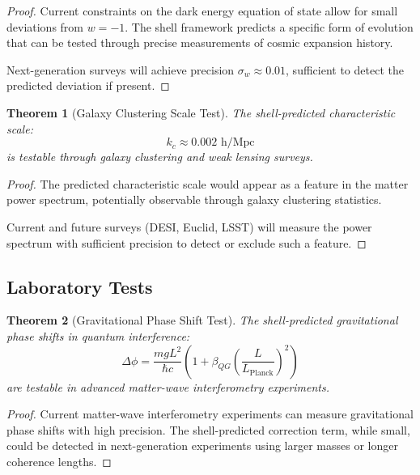 \documentclass[12pt,a4paper]{article}
\newtheorem{theorem}{Theorem}[section]
\begin{document}
\begin{proof}
Current constraints on the dark energy equation of state allow for small deviations from $w = -1$. The shell framework predicts a specific form of evolution that can be tested through precise measurements of cosmic expansion history.

Next-generation surveys will achieve precision $\sigma_w \approx 0.01$, sufficient to detect the predicted deviation if present.
\end{proof}

\begin{theorem}[Galaxy Clustering Scale Test]
\label{thm:galaxy-clustering}
The shell-predicted characteristic scale:
\begin{equation}
k_c \approx 0.002 \text{ h/Mpc}
\end{equation}
is testable through galaxy clustering and weak lensing surveys.
\end{theorem}

\begin{proof}
The predicted characteristic scale would appear as a feature in the matter power spectrum, potentially observable through galaxy clustering statistics.

Current and future surveys (DESI, Euclid, LSST) will measure the power spectrum with sufficient precision to detect or exclude such a feature.
\end{proof}

\subsection{Laboratory Tests}
\label{subsec:laboratory-tests}

\begin{theorem}[Gravitational Phase Shift Test]
\label{thm:phase-shift-test}
The shell-predicted gravitational phase shifts in quantum interference:
\begin{equation}
\Delta\phi = \frac{m g L^2}{\hbar c} \left(1 + \beta_{QG} \left(\frac{L}{L_{\text{Planck}}}\right)^2\right)
\end{equation}
are testable in advanced matter-wave interferometry experiments.
\end{theorem}

\begin{proof}
Current matter-wave interferometry experiments can measure gravitational phase shifts with high precision. The shell-predicted correction term, while small, could be detected in next-generation experiments using larger masses or longer coherence lengths.
\end{proof}
\end{document}
